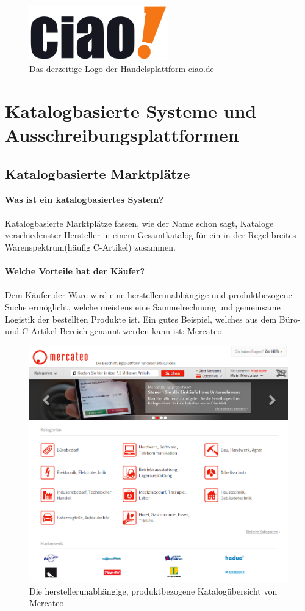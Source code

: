 \documentclass[11pt,a4paper]{article}
\begin{document}
\begin{figure}[ht!]
	\centering
	\includegraphics[width=60mm]{ciao}
	\caption{Das derzeitige Logo der Handelsplattform ciao.de \label{ciao}}
\end{figure}

\newpage
\section{Katalogbasierte Systeme und Ausschreibungsplattformen}

\subsection{Katalogbasierte Marktplätze}
\textbf{Was ist ein katalogbasiertes System?} \\ \\
\noindent Katalogbasierte Marktplätze fassen, wie der Name schon sagt, Kataloge verschiedenster Hersteller in einem Gesamtkatalog für ein in der Regel breites Warenspektrum(häufig C-Artikel) zusammen. \\ \\
\textbf{Welche Vorteile hat der Käufer?}
\\ \\ Dem Käufer der Ware wird eine herstellerunabhängige und produktbezogene Suche ermöglicht, welche meistens eine Sammelrechnung und gemeinsame Logistik der bestellten Produkte ist. Ein gutes Beispiel, welches aus dem Büro- und C-Artikel-Bereich genannt werden kann ist: Mercateo

\begin{figure}[ht!]
	\centering
	\includegraphics[width=180mm]{mercateo}
	\caption{Die herstellerunabhängige, produktbezogene Katalogübersicht von Mercateo \label{mercateo}}
\end{figure}
\end{document}
